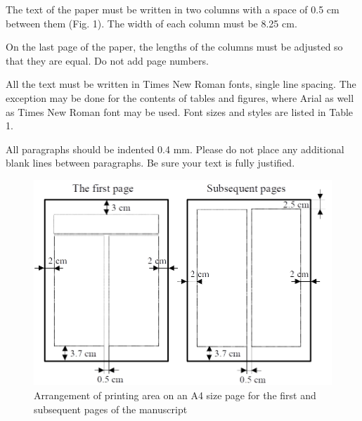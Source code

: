 \documentclass[9pt]{extarticle}
\begin{document}
The text of the paper must be written in two columns with a space of 0.5 cm between them (Fig. 1). The width of each column must be 8.25 cm.

On the last page of the paper, the lengths of the columns must be adjusted so that they are equal. Do not add page numbers.

All the text must be written in Times New Roman fonts, single line spacing. The exception may be done for the contents of tables and figures, where Arial as well as Times New Roman font may be used. Font sizes and styles are listed in Table 1.

All paragraphs should be indented 0.4 mm. Please do not place any additional blank lines between paragraphs. Be sure your text is fully justified.

\begin{figure}[!h]
	\centering
	\includegraphics[width=1.0\columnwidth]{page-layout.png}
	\caption{Arrangement of printing area on an A4 size page for the first and subsequent pages of the manuscript}
	\label{fig:page-layout}
\end{figure}
\end{document}
